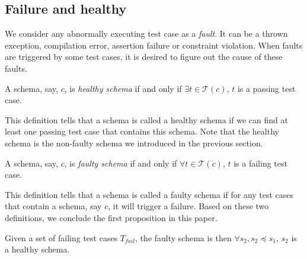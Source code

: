 \begin{definition} \label{de:containschemas}

\end{definition}


\begin{definition} \label{de:specialschema}

\end{definition}


\subsection{Failure and healthy}\label{sec:back:failureandhealthy}

We consider any abnormally executing test case as a \emph{fault}. It can be a thrown exception, compilation error, assertion failure or constraint violation. When faults are triggered by some test cases, it is desired to figure out the cause of these faults.

\begin{definition}\label{de:healthy}
A schema, say, $c$, is \emph{healthy schema} if and only if $\exists t \in \mathcal{T}(c)$, $t$ is a passing test case.%
\end{definition}

This definition tells that a schema is called a healthy schema if we can find at least one passing test case that contains this schema. Note that the healthy schema is the non-faulty schema we introduced in the previous section.

\begin{definition}\label{de:faulty}
A schema, say, $c$, is \emph{faulty schema} if and only if $\forall t \in \mathcal{T}(c)$, $t$ is a failing test case.
\end{definition}

This definition tells that a schema is called a faulty schema if for any test cases that contain a schema, say $c$, it will trigger a failure. Based on these two definitions, we conclude the first proposition in this paper.

\begin{proposition}\label{pro:subofhealthy}
Given a set of failing test cases  $T_{fail}$, the faulty schema is then $\forall s_{2}, s_{2} \preceq s_{1}$, $s_{2}$ is a healthy schema.
\end{proposition}

